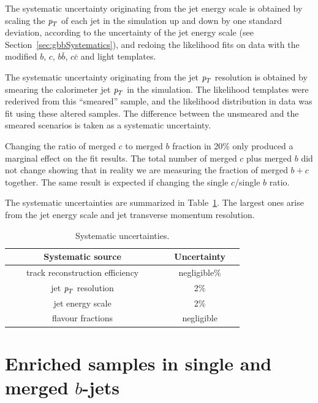 The systematic uncertainty originating from the jet energy scale is obtained by scaling the ${\emph{p}_{T}}$ of each jet in the simulation up and down by one standard deviation, according to the uncertainty of the jet energy scale (see Section~\ref{sec:gbbSystematics}), and redoing the likelihood fits on data with the modified $b$, $c$, $b\bar{b}$, $c\bar{c}$ and light templates.


The systematic uncertainty originating from the jet  ${\emph{p}_{T}}$ resolution is obtained by smearing the calorimeter jet ${\emph{p}_{T}}$ in the simulation. The likelihood templates were rederived from this ``smeared'' sample, and the likelihood distribution in data was fit using these altered samples. The difference between the unsmeared and the smeared scenarios is taken as a systematic uncertainty. 

Changing the ratio of merged $c$ to merged $b$ fraction in 20\% only produced a marginal effect on the fit results. The total number of merged $c$ plus merged $b$ did not change showing that in reality we are measuring the fraction of merged $b+c$ together. The same result is expected if changing the single $c$/single $b$ ratio.


The systematic uncertainties are summarized in Table~\ref{tb:systematicsfits}. The largest ones arise from the jet energy scale and jet transverse momentum resolution. 
\begin{table}[!hbt] %
\renewcommand{\arraystretch}{1.2}
\centering
\begin{tabular}{ | c | c |}
\hline
  ~~~~~~~Systematic source~~~~~~~ &~~Uncertainty~~\\ \hline
  track reconstruction efficiency  &    negligible\%        \\ 
  jet ${\emph{p}_{T}}$ resolution  &    2\%        \\  
  jet energy scale  &    2\%        \\ \hline 
  flavour fractions  &    negligible        \\ \hline 
\end{tabular}
\caption{Systematic uncertainties.}
\label{tb:systematicsfits}
\end{table}





\section{Enriched samples in single and merged $b$-jets}\label{sec:Enriched}

